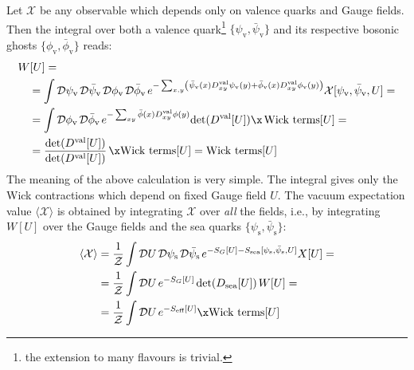 \documentclass[english, LaM, oneside, noexaminfo]{sapthesis}
\newcommand{\la}{\langle}
\newcommand{\ra}{\rangle}
\begin{document}
Let $\mathcal{X}$ be any observable which depends only on valence quarks and Gauge fields.
Then the integral over both a valence quark\footnote{the extension to many flavours is trivial.} $\{\psi_\text{v},\bar\psi_\text{v}\}$ and its respective bosonic ghosts $\{\phi_\text{v}, \bar\phi_\text{v} \}$ reads:
\begin{equation*}
    \begin{aligned}
        & W[U] = \\ 
        & \quad = \int \mathcal{D}\psi_\text{v} \hspace*{0.5mm} \mathcal{D}\bar\psi_\text{v} \hspace*{0.5mm} \mathcal{D}\phi_\text{v} \hspace*{0.5mm} \mathcal{D}\bar\phi_\text{v} \hspace*{0.5mm} e^{-\sum_{x,y} \left( \bar\psi_\text{v} (x) D^\text{val}_{xy} \psi_\text{v} (y) + \bar\phi_\text{v} (x) D^\text{val}_{xy} \phi_\text{v} (y) \right)} \mathcal{X}[\psi_\text{v},\bar\psi_\text{v},U] = \\
        & \quad = \int \mathcal{D}\phi_\text{v} \hspace*{0.5mm} \mathcal{D}\bar\phi_\text{v} \hspace*{0.5mm} e^{- \sum_{xy} \bar\phi (x) D^\text{val}_{xy} \phi (y)} \text{det}(D^\text{val}[U]) \x \hspace*{.5mm} \text{Wick terms}[U] = \\
        & \quad = \frac{\text{det}(D^\text{val}[U])}{\text{det}(D^\text{val}[U])}\hspace*{.5mm} \x \text{Wick terms}[U] = \text{Wick terms}[U]
    \end{aligned}
\end{equation*}
The meaning of the above calculation is very simple. The integral gives only the Wick contractions which depend on fixed Gauge field $U$.
The vacuum expectation value $\la\mathcal{X}\ra$ is obtained by integrating $\mathcal{X}$ over {\it all} the fields, i.e., by integrating $W[U]$ over the Gauge fields and the sea quarks $\{\psi_\text{s},\bar\psi_\text{s}\}$:
\begin{equation*}
    \begin{aligned}
        \la \mathcal{X} \ra
        & = \frac{1}{\mathcal{Z}} \int \mathcal{D}U \hspace*{.5mm} \mathcal{D}\psi_\text{s} \hspace*{0.5mm} \mathcal{D}\bar\psi_\text{s} \hspace*{.5mm} e^{-S_G[U]-S_\text{sea}[\psi_\text{s},\bar\psi_\text{s},U]} X[U] = \\
        & = \frac{1}{\mathcal{Z}} \int \mathcal{D}U \hspace*{.5mm} e^{-S_G[U]} \hspace*{.5mm} \text{det}(D_\text{sea}[U]) \hspace*{.5mm} W[U]= \\
        & = \frac{1}{\mathcal{Z}} \int \mathcal{D}U \hspace*{.5mm} e^{-S_\text{eff}[U]} \x \text{Wick terms}[U]
    \end{aligned}
\end{equation*}
\end{document}
